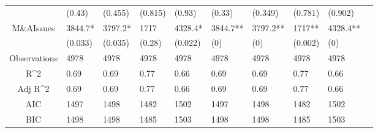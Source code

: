 \documentclass{article}
\begin{document}
\begin{table}[H]
\begin{tabular}{|clllllllll|}
   & (0.43) & (0.455) & (0.815) & (0.93) & (0.33) & (0.349) & (0.781) & (0.902) & \\ 
  M\&AIssues & 3844.7* & 3797.2* & 1717 & 4328.4* & 3844.7** & 3797.2** & 1717** & 4328.4** & \\ 
   & (0.033) & (0.035) & (0.28) & (0.022) & (0) & (0) & (0.002) & (0) & \\ 
  \hline 
 Observations & 4978 & 4978 & 4978 & 4978 & 4978 & 4978 & 4978 & 4978 & \\ 
  R^2 & 0.69 & 0.69 & 0.77 & 0.66 & 0.69 & 0.69 & 0.77 & 0.66 & \\ 
  Adj R^2 & 0.69 & 0.69 & 0.77 & 0.66 & 0.69 & 0.69 & 0.77 & 0.66 & \\ 
  AIC & 1497 & 1498 & 1482 & 1502 & 1497 & 1498 & 1482 & 1502 & \\ 
  BIC & 1498 & 1498 & 1485 & 1503 & 1498 & 1498 & 1485 & 1503 & \\ 
   \hline
\end{tabular}
 
\end{table}
\end{document}
